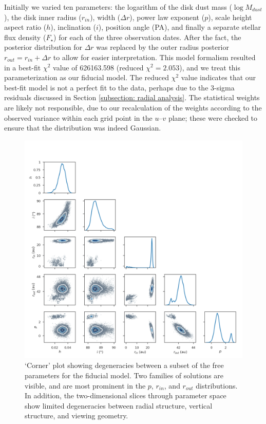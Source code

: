 \documentclass[modern]{aastex62}
\begin{document}
Initially we varied ten parameters: the logarithm of the disk dust mass ($\log M_{dust}$), the disk inner radius ($r_{in}$), width ($\Delta r$), power law exponent ($p$), scale height aspect ratio ($h$), inclination ($i$), position angle (PA), and finally a separate stellar flux density ($F_\star$) for each of the three observation dates. 
After the fact, the posterior distribution for $\Delta r$ was replaced by the outer radius posterior $r_{out} = r_{in} + \Delta r$ to allow for easier interpretation.
This model formalism resulted in a best-fit $\chi^2$ value of 626163.598 (reduced $\chi^2=2.053$), and we treat this parameterization as our fiducial model.
The reduced $\chi^2$ value indicates that our best-fit model is not a perfect fit to the data, perhaps due to the 3-sigma residuals discussed in Section \ref{subsection: radial analysis}.  
The statistical weights are likely not responsible, due to our recalculation of the weights according to the observed variance within each grid point in the $u$\nobreakdash--$v$ plane; these were checked to ensure that the distribution was indeed Gaussian.

\begin{figure}
  \centering
  \includegraphics[width=0.9\linewidth]{../figures/degeneracy_corner}
  \caption{`Corner' plot showing degeneracies between a subset of the free parameters for the fiducial model.
  Two families of solutions are visible, and are most prominent in the $p$, $r_{in}$, and $r_{out}$ distributions.
  In addition, the two-dimensional slices through parameter space show limited degeneracies between radial structure, vertical structure, and viewing geometry.}
  \label{fig: degeneracies}
\end{figure}
\end{document}
